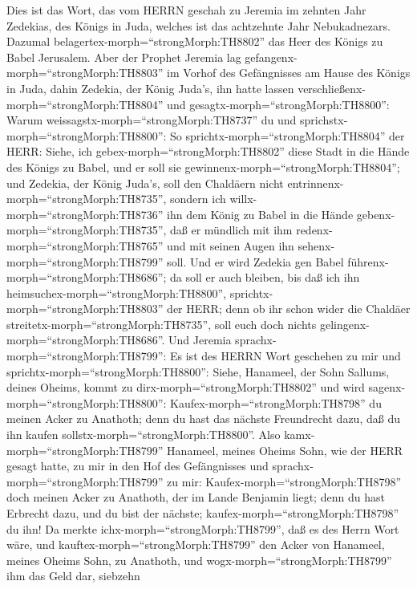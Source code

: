  Dies ist das Wort, das vom HERRN geschah zu Jeremia im
zehnten Jahr Zedekias, des Königs in Juda, welches ist das achtzehnte
Jahr Nebukadnezars.  Dazumal
belagertex-morph=``strongMorph:TH8802'' das Heer des Königs zu Babel
Jerusalem. Aber der Prophet Jeremia lag
gefangenx-morph=``strongMorph:TH8803'' im Vorhof des Gefängnisses am
Hause des Königs in Juda,  dahin Zedekia, der König Juda's,
ihn hatte lassen verschließenx-morph=``strongMorph:TH8804'' und
gesagtx-morph=``strongMorph:TH8800'': Warum
weissagstx-morph=``strongMorph:TH8737'' du und
sprichstx-morph=``strongMorph:TH8800'': So
sprichtx-morph=``strongMorph:TH8804'' der HERR: Siehe, ich
gebex-morph=``strongMorph:TH8802'' diese Stadt in die Hände des Königs
zu Babel, und er soll sie gewinnenx-morph=``strongMorph:TH8804'';
 und Zedekia, der König Juda's, soll den Chaldäern nicht
entrinnenx-morph=``strongMorph:TH8735'', sondern ich
willx-morph=``strongMorph:TH8736'' ihn dem König zu Babel in die Hände
gebenx-morph=``strongMorph:TH8735'', daß er mündlich mit ihm
redenx-morph=``strongMorph:TH8765'' und mit seinen Augen ihn
sehenx-morph=``strongMorph:TH8799'' soll.  Und er wird
Zedekia gen Babel führenx-morph=``strongMorph:TH8686''; da soll er auch
bleiben, bis daß ich ihn heimsuchex-morph=``strongMorph:TH8800'',
sprichtx-morph=``strongMorph:TH8803'' der HERR; denn ob ihr schon wider
die Chaldäer streitetx-morph=``strongMorph:TH8735'', soll euch doch
nichts gelingenx-morph=``strongMorph:TH8686''.  Und Jeremia
sprachx-morph=``strongMorph:TH8799'': Es ist des HERRN Wort geschehen zu
mir und sprichtx-morph=``strongMorph:TH8800'':  Siehe,
Hanameel, der Sohn Sallums, deines Oheims, kommt zu
dirx-morph=``strongMorph:TH8802'' und wird
sagenx-morph=``strongMorph:TH8800'': Kaufex-morph=``strongMorph:TH8798''
du meinen Acker zu Anathoth; denn du hast das nächste Freundrecht dazu,
daß du ihn kaufen sollstx-morph=``strongMorph:TH8800''. 
Also kamx-morph=``strongMorph:TH8799'' Hanameel, meines Oheims Sohn, wie
der HERR gesagt hatte, zu mir in den Hof des Gefängnisses und
sprachx-morph=``strongMorph:TH8799'' zu mir:
Kaufex-morph=``strongMorph:TH8798'' doch meinen Acker zu Anathoth, der
im Lande Benjamin liegt; denn du hast Erbrecht dazu, und du bist der
nächste; kaufex-morph=``strongMorph:TH8798'' du ihn! Da merkte
ichx-morph=``strongMorph:TH8799'', daß es des Herrn Wort wäre,
 und kauftex-morph=``strongMorph:TH8799'' den Acker von
Hanameel, meines Oheims Sohn, zu Anathoth, und
wogx-morph=``strongMorph:TH8799'' ihm das Geld dar, siebzehn
